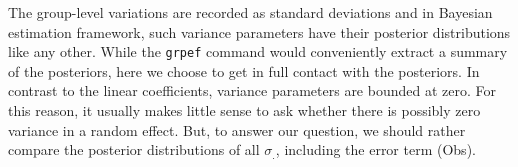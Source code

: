 \documentclass[]{svmono}
\newenvironment{Shaded}{\begin{snugshade}}{\end{snugshade}}
\newcommand{\KeywordTok}[1]{\textcolor[rgb]{0.13,0.29,0.53}{\textbf{#1}}}
\newcommand{\DataTypeTok}[1]{\textcolor[rgb]{0.13,0.29,0.53}{#1}}
\newcommand{\DecValTok}[1]{\textcolor[rgb]{0.00,0.00,0.81}{#1}}
\newcommand{\StringTok}[1]{\textcolor[rgb]{0.31,0.60,0.02}{#1}}
\newcommand{\OperatorTok}[1]{\textcolor[rgb]{0.81,0.36,0.00}{\textbf{#1}}}
\newcommand{\NormalTok}[1]{#1}
\theoremstyle{definition}
\theoremstyle{definition}
\theoremstyle{definition}
\theoremstyle{remark}
\begin{document}
\begin{Shaded}
\end{Shaded}

The group-level variations are recorded as standard deviations and in
Bayesian estimation framework, such variance parameters have their
posterior distributions like any other. While the \texttt{grpef} command
would conveniently extract a summary of the posteriors, here we choose
to get in full contact with the posteriors. In contrast to the linear
coefficients, variance parameters are bounded at zero. For this reason,
it usually makes little sense to ask whether there is possibly zero
variance in a random effect. But, to answer our question, we should
rather compare the posterior distributions of all \(\sigma_.\),
including the error term (Obs).

\begin{Shaded}
\end{Shaded}
\end{document}
